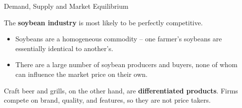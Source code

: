 \documentclass[12pt,t]{beamer}
\begin{document}
\begin{frame}{Demand, Supply and Market Equilibrium}

\bigskip
The \textbf{soybean industry} is most likely to be perfectly competitive.
  \begin{itemize}
    \item Soybeans are a homogeneous commodity -- one farmer's soybeans are essentially identical to another's.
    \item There are a large number of soybean producers and buyers, none of whom can influence the market price on their own.
  \end{itemize}

  \bigskip
  Craft beer and grills, on the other hand, are \textbf{differentiated products}. Firms compete on brand, quality, and features, so they are not price takers.
\end{frame}
\end{document}
